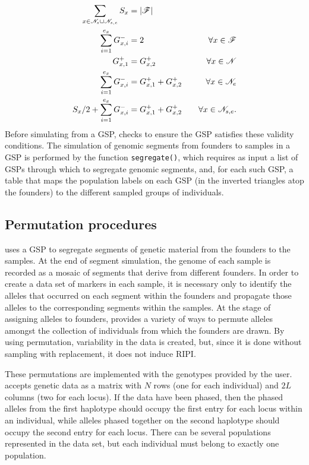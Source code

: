\begin{equation}
\begin{aligned}
\sum_{x \in \mathscr{N}_s \cup \mathscr{N}_{s,e}} S_x &= |\mathscr{F}| &  \\
\sum_{i=1}^{e_x} G^-_{x,i} &= 2 & \forall x \in \mathscr{F} \\
G^+_{x,1} &= G^+_{x,2} & \forall x \in \mathscr{N} \\
\sum_{i=1}^{e_x} G^-_{x,i} &= G^+_{x,1} +  G^+_{x,2} & \forall x \in \mathscr{N}_e  \\
 S_x/2 + \sum_{i=1}^{e_x} G^-_{x,i} &= G^+_{x,1} +  G^+_{x,2} & ~~~\forall x \in \mathscr{N}_{s,e}.  \\
\end{aligned}
\end{equation}
Before simulating from a GSP, \gscramble{} checks to ensure the GSP
satisfies these validity conditions.  The simulation of genomic segments
from founders to samples in a GSP is performed by the \gscramble{} function
{\footnotesize\tt segregate()}, which requires as input a list of GSPs through which
to segregate genomic segments, and, for each such GSP, a table that maps the
population labels on each GSP (in the inverted triangles atop the founders) to the
different sampled groups of individuals.

\subsection*{Permutation procedures}

\gscramble{} uses a GSP to segregate segments of genetic material from the founders
to the samples.  At the end of segment simulation, the genome of each sample
is recorded as a mosaic of segments that derive from different founders.  In order
to create a data set of markers in each sample, it is necessary only to identify the alleles
that occurred on each segment within the founders and propagate those alleles to the
corresponding segments within the samples.  At the stage of assigning alleles to
founders, \gscramble{} provides a variety of ways to permute alleles amongst
the collection of individuals from which the founders are drawn.  By using permutation,
variability in the data is created, but, since it is done without sampling with replacement, it does
not induce RIPI.

These permutations are implemented with the genotypes provided by the user.
\gscramble{} accepts genetic data as a matrix with $N$ rows (one for each individual) and
$2L$ columns (two for each locus). If the data have been phased, then the phased alleles from the
first haplotype should occupy the
first entry for each locus within an individual, while alleles phased together on the second haplotype should occupy the
second entry for each locus.
There can be several populations represented in the data set, but
each individual must belong to exactly one
population.

